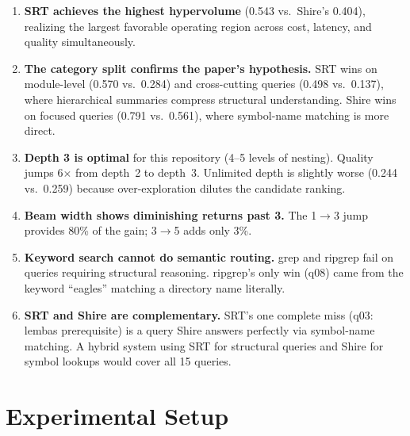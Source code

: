\documentclass[11pt,a4paper]{article}
\begin{document}
\begin{enumerate}[nosep]
    \item \textbf{SRT achieves the highest hypervolume} (0.543 vs.\ Shire's 0.404), realizing the largest favorable operating region across cost, latency, and quality simultaneously.

    \item \textbf{The category split confirms the paper's hypothesis.} SRT wins on module-level (0.570 vs.\ 0.284) and cross-cutting queries (0.498 vs.\ 0.137), where hierarchical summaries compress structural understanding. Shire wins on focused queries (0.791 vs.\ 0.561), where symbol-name matching is more direct.

    \item \textbf{Depth 3 is optimal} for this repository (4--5 levels of nesting). Quality jumps 6$\times$ from depth~2 to depth~3. Unlimited depth is slightly worse (0.244 vs.\ 0.259) because over-exploration dilutes the candidate ranking.

    \item \textbf{Beam width shows diminishing returns past 3.} The 1$\to$3 jump provides 80\% of the gain; 3$\to$5 adds only 3\%.

    \item \textbf{Keyword search cannot do semantic routing.} grep and ripgrep fail on queries requiring structural reasoning. ripgrep's only win (q08) came from the keyword ``eagles'' matching a directory name literally.

    \item \textbf{SRT and Shire are complementary.} SRT's one complete miss (q03: lembas prerequisite) is a query Shire answers perfectly via symbol-name matching. A hybrid system using SRT for structural queries and Shire for symbol lookups would cover all 15 queries.
\end{enumerate}

\section{Experimental Setup}
\end{document}
